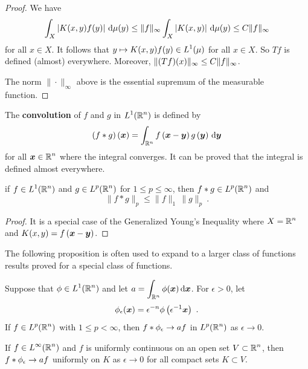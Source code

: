 \begin{proof}
 We have
\[
\int_X \left| K(x,y)f(y)\right| \,\mathrm{d}{\mu(y)}
\leq \|f\|_\infty \int_X \left| K(x,y)\right| \,\mathrm{d}{\mu(y)}
\leq C \|f\|_\infty
\]
for all $x\in X$.
It follows that $\displaystyle y \mapsto K(x,y)f(y) \in L^1(\mu)$ for
all $x\in X$.  So $Tf$ is defined (almost) everywhere.  Moreover,
$\displaystyle \| (Tf)(x)\|_\infty \leq C \| f\|_\infty$.

The norm $\| \cdot \|_\infty$ above is the essential supremum of the
measurable function.
\end{proof}

The {\bfseries convolution} of $f$ and $g$ in
$\displaystyle L^1(\mathbb{R}^n)$ is defined by
\[
(f\ast g)\left({\bm{x}}\right) = \int_{\mathbb{R}^n}
f\left({\bm{x}} - {\bm{y}}\right)  g\left({\bm{y}}\right) \,\mathrm{d}{{\bm{y}}}
\]
for all $\displaystyle {\bm{x}} \in \mathbb{R}^n$ where the integral
converges.  It can be proved that the integral is defined almost
everywhere.

\begin{theorem} \label{distr_sp_young}
if $\displaystyle f \in L^1(\mathbb{R}^n)$ and $\displaystyle g\in L^p(\mathbb{R}^n)$
for $1\leq p \leq \infty$, then $\displaystyle f\ast g \in L^p(\mathbb{R}^n)$ and
\[
\| f\ast g \|_p \leq \|f \|_1 \, \|g\|_p \ .
\]
\end{theorem}

\begin{proof}
It is a special case of the Generalized Young's Inequality where
$\displaystyle X=\mathbb{R}^n$ and $K(x,y) = f\left({\bm{x}}-{\bm{y}}\right)$.
\end{proof}

The following proposition is often used to expand to a larger class of
functions results proved for a special class of functions.

\begin{prop} \label{distr_limit_convol}
Suppose that $\displaystyle \phi \in L^1(\mathbb{R}^n)$ and let
$\displaystyle a = \int_{\mathbb{R}^n} \phi({\bm{x}})\,\mathrm{d}{{\bm{x}}}$.  For
$\epsilon >0$, let
\[
\phi_\epsilon({\bm{x}}) = \epsilon^{-n}
\phi\left(\epsilon^{-1}{\bm{x}}\right) \ .
\]
If $\displaystyle f \in L^p(\mathbb{R}^n)$ with $1 \leq p < \infty$, then
$\displaystyle f\ast \phi_\epsilon \rightarrow a f$ in
$\displaystyle L^p(\mathbb{R}^n)$ as $\epsilon \rightarrow 0$.

If $\displaystyle f \in L^\infty(\mathbb{R}^n)$ and $f$ is uniformly continuous on
an open set $\displaystyle V\subset \mathbb{R}^n$, then
$\displaystyle f\ast \phi_\epsilon \rightarrow a f$ uniformly on
$K$ as $\epsilon \rightarrow 0$ for all compact sets $K\subset V$.
\end{prop}

